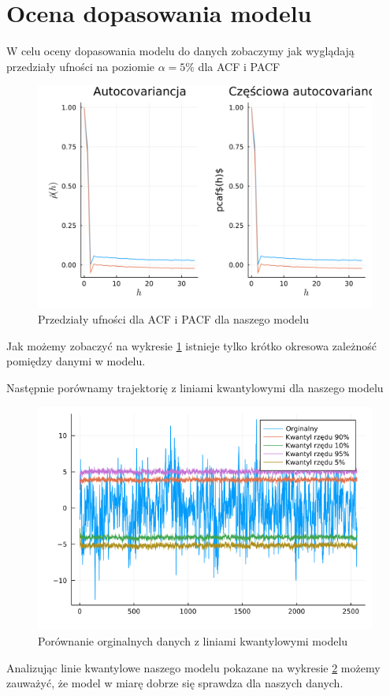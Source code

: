 \documentclass[12pt]{article}
\theoremstyle{exer}
\begin{document}
	
	
	\section{Ocena dopasowania modelu}
	W celu oceny dopasowania modelu do danych zobaczymy jak wyglądają przedziały ufności na poziomie $\alpha = 5\%$ dla ACF i PACF 
	\begin{figure}[H]
		\centering
		\includegraphics[width=3\columnwidth/4]{img/acf_pacf.png}
		\caption{Przedziały ufności dla ACF i PACF dla naszego modelu}
		\label{fig:model_acf_pacf}
	\end{figure}
	Jak możemy zobaczyć na wykresie \ref{fig:model_acf_pacf} istnieje tylko krótko okresowa zależność pomiędzy danymi w modelu.
	
	
	Następnie porównamy trajektorię z liniami kwantylowymi dla naszego modelu
	\begin{figure}[H]
		\centering
		\includegraphics[width=3\columnwidth/4]{img/linie_kwantylowe.png}
		\caption{Porównanie orginalnych danych z liniami kwantylowymi modelu}
		\label{fig:linie_kwantylowe}
	\end{figure}
Analizując linie kwantylowe naszego modelu pokazane na wykresie \ref{fig:linie_kwantylowe} możemy zauważyć, że model w miarę dobrze się sprawdza dla naszych danych. 
\end{document}
